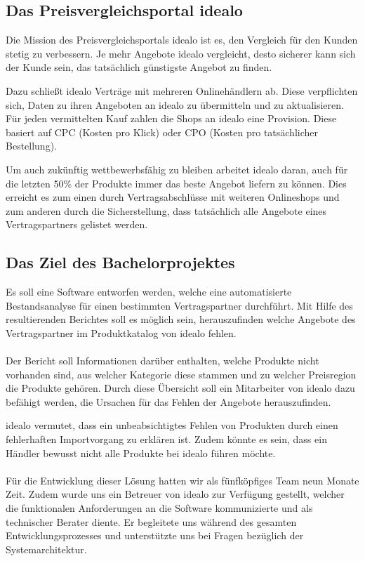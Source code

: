 \subsection{Das Preisvergleichsportal idealo}
\label{subsec:idealo}

Die Mission des Preisvergleichsportals idealo ist es, den Vergleich für den Kunden stetig zu verbessern.
Je mehr Angebote idealo vergleicht, desto sicherer kann sich der Kunde sein, das tatsächlich günstigste Angebot zu
finden.

Dazu schließt idealo Verträge mit mehreren Onlinehändlern ab.
Diese verpflichten sich, Daten zu ihren Angeboten an idealo zu übermitteln und zu aktualisieren.
Für jeden vermittelten Kauf zahlen die Shops an idealo eine Provision.
Diese basiert auf CPC (Kosten pro Klick) oder CPO (Kosten pro tatsächlicher Bestellung).

Um auch zukünftig wettbewerbsfähig zu bleiben arbeitet idealo daran, auch für die letzten 50\% der Produkte
immer das beste Angebot liefern zu können.
Dies erreicht es zum einen durch Vertragsabschlüsse mit weiteren Onlineshops und zum anderen durch die
Sicherstellung, dass tatsächlich alle Angebote eines Vertragspartners gelistet werden.

\subsection{Das Ziel des Bachelorprojektes}
\label{subsec:projektziel}

Es soll eine Software entworfen werden, welche eine automatisierte Bestandsanalyse für einen bestimmten
Vertragspartner durchführt.
Mit Hilfe des resultierenden Berichtes soll es möglich sein, herauszufinden welche Angebote des Vertragspartner im
Produktkatalog von idealo fehlen.
\\
~\\
Der Bericht soll Informationen darüber enthalten, welche Produkte nicht vorhanden sind, aus welcher Kategorie diese
stammen und zu welcher Preisregion die Produkte gehören.
Durch diese Übersicht soll ein Mitarbeiter von idealo dazu befähigt werden, die Ursachen für das Fehlen der Angebote
herauszufinden.

idealo vermutet, dass ein unbeabsichtigtes Fehlen von Produkten durch einen fehlerhaften Importvorgang zu erklären ist.
Zudem könnte es sein, dass ein Händler bewusst nicht alle Produkte bei idealo führen möchte.
\\
~\\
Für die Entwicklung dieser Lösung hatten wir als fünfköpfiges Team neun Monate Zeit.
Zudem wurde uns ein Betreuer von idealo zur Verfügung gestellt, welcher die funktionalen Anforderungen an die
Software kommunizierte und als technischer Berater diente.
Er begleitete uns während des gesamten Entwicklungsprozesses und unterstützte uns bei Fragen bezüglich der
Systemarchitektur.

